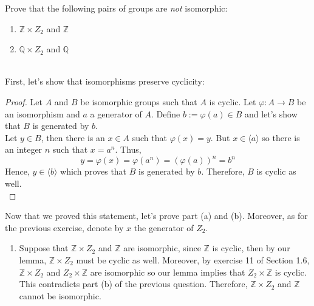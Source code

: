 \begin{exercise}
    Prove that the following pairs of groups are \textit{not} isomorphic:
    \begin{enumerate}[label=(\alph*)]
        \item $\mathbb{Z}\times Z_2$ and $\mathbb{Z}$
        \item $\mathbb{Q}\times Z_2$ and $\mathbb{Q}$\\
    \end{enumerate}
\end{exercise}

\begin{solution}
    \\First, let's show that isomorphisms preserve cyclicity:
    \begin{proof}
        Let $A$ and $B$ be isomorphic groups such that $A$ is cyclic. Let
        $\varphi:A\to B$ be an isomorphism and $a$ a generator of $A$.
        Define $b:=\varphi(a)\in B$ and let's show that $B$ is generated 
        by $b$.\\
        Let $y\in B$, then there is an $x\in A$ such that $\varphi(x)=y$. 
        But $x\in \langle a \rangle$ so there is an integer $n$ such that
        $x=a^n$. Thus,
        $$y=\varphi(x)=\varphi(a^n)=(\varphi(a))^n=b^n$$
        Hence, $y\in\langle b \rangle$ which proves that $B$ is generated
        by $b$. Therefore, $B$ is cyclic as well.\\
    \end{proof}
    Now that we proved this statement, let's prove part (a) and (b).
    Moreover, as for the previous exercise, denote by $x$ the generator
    of $Z_2$.
    \begin{enumerate}[label=(\alph*)]
        \item Suppose that $\mathbb{Z}\times Z_2$ and $\mathbb{Z}$ are
        isomorphic, since $\mathbb{Z}$ is cyclic, then by our lemma, 
        $\mathbb{Z}\times Z_2$ must be cyclic as well. Moreover, by
        exercise 11 of Section 1.6, $\mathbb{Z}\times Z_2$ and
        $Z_2\times \mathbb{Z}$ are isomorphic so our lemma implies that
        $Z_2\times \mathbb{Z}$ is cyclic. This contradicts part (b) of the
        previous question. Therefore, $\mathbb{Z}\times Z_2$ and
        $\mathbb{Z}$ cannot be isomorphic.


\end{enumerate}
\end{solution}

